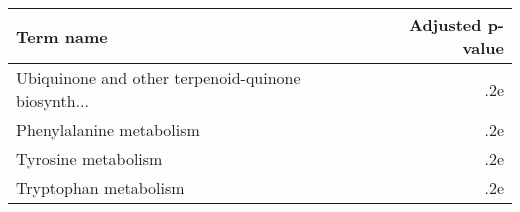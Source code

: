 \begin{tabular}{lr}
\toprule
                                         Term name &  Adjusted p-value \\
\midrule
Ubiquinone and other terpenoid-quinone biosynth... &               .2e \\
                          Phenylalanine metabolism &               .2e \\
                               Tyrosine metabolism &               .2e \\
                             Tryptophan metabolism &               .2e \\
\bottomrule
\end{tabular}
